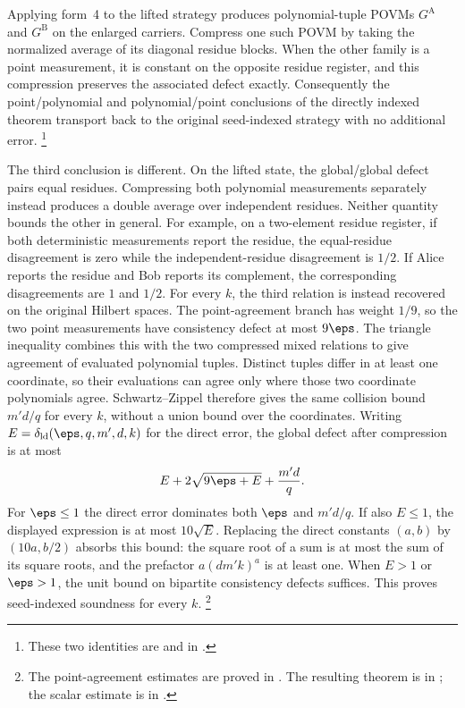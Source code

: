 \documentclass[11pt]{article}
\begin{document}
Applying form~4 to the lifted strategy produces polynomial-tuple POVMs
$G^{\mathrm A}$ and $G^{\mathrm B}$ on the enlarged carriers.  Compress one
such POVM by taking the normalized average of its diagonal residue blocks.
When the other family is a point measurement, it is constant on the opposite
residue register, and this compression preserves the associated defect
exactly.  Consequently the point/polynomial and polynomial/point conclusions
of the directly indexed theorem transport back to the original seed-indexed
strategy with no additional error.%
\footnote{These two identities are
 and
 in
.}

The third conclusion is different.  On the lifted state, the
global/global defect pairs equal residues.  Compressing both polynomial
measurements separately instead produces a double average over independent
residues.  Neither quantity bounds the other in general.  For example, on a
two-element residue register, if both deterministic measurements report the
residue, the equal-residue disagreement is zero while the independent-residue
disagreement is $1/2$.  If Alice reports the residue and Bob reports its
complement, the corresponding disagreements are $1$ and $1/2$. For every $k$,
the third relation is instead recovered on the original Hilbert spaces.
The point-agreement branch has weight $1/9$, so the two point measurements
have consistency defect at most $9\eps$. The triangle inequality combines
this with the two compressed mixed relations to give agreement of evaluated
polynomial tuples. Distinct tuples differ in at least one coordinate, so
their evaluations can agree only where those two coordinate polynomials
agree. Schwartz--Zippel therefore gives the same collision bound $m'd/q$
for every $k$, without a union bound over the coordinates.
Writing $E=\delta_{\mathrm{ld}}(\eps,q,m',d,k)$ for the direct error, the
global defect after compression is at most
\[
  E+2\sqrt{9\eps+E}+\frac{m'd}{q}.
\]
For $\eps\leq1$ the direct error dominates both $\eps$ and $m'd/q$.
If also $E\leq1$, the displayed expression is at most $10\sqrt E$.
Replacing the direct constants $(a,b)$ by $(10a,b/2)$ absorbs this bound:
the square root of a sum is at most the sum of its square roots, and the
prefactor $a(dm'k)^a$ is at least one. When $E>1$ or $\eps>1$, the unit
bound on bipartite consistency defects suffices. This proves seed-indexed
soundness for every $k$.%
\footnote{The point-agreement estimates are proved in
.
The resulting theorem is  in
; the scalar estimate is
 in
.}
\end{document}
